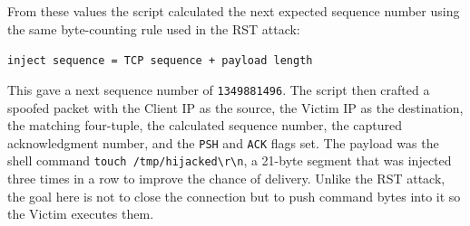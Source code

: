 From these values the script calculated the next expected sequence number using the same byte-counting rule used in the RST attack:

\begin{center}
\texttt{inject sequence = TCP sequence + payload length}
\end{center}

This gave a next sequence number of \texttt{1349881496}. The script then crafted a spoofed packet with the Client IP as the source, the Victim IP as the destination, the matching four-tuple, the calculated sequence number, the captured acknowledgment number, and the \texttt{PSH} and \texttt{ACK} flags set. The payload was the shell command \texttt{touch /tmp/hijacked\textbackslash r\textbackslash n}, a 21-byte segment that was injected three times in a row to improve the chance of delivery. Unlike the RST attack, the goal here is not to close the connection but to push command bytes into it so the Victim executes them.

